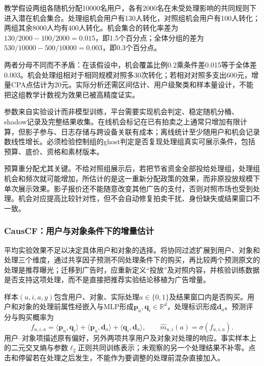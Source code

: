\begin{example}[全体留出与机会对应的分母]
教学假设两组各随机分配10000名用户，各有2000名在未受处理影响的共同规则下进入潜在机会集合。处理组机会用户有130人转化，对照组机会用户有100人转化；两组其余8000人均有400人转化。机会集合的转化率差为$130/2000-100/2000=0.015$，即1.5个百分点；全体分组的差为$530/10000-500/10000=0.003$，即0.3个百分点。

两者分母不同而不矛盾：在该假设中，机会覆盖比例0.2乘条件差0.015等于全体差0.003。机会处理组相对于相同规模对照多30次转化；若相对对照多支出600元，增量CPA点估计为20元。实际分析还需区间估计、用户级聚类和样本量设计，不能把这组教学计数视为效果已被高精度证实。
\end{example}

参数来自实验设计而非模型训练，平台需要实现机会判定、稳定随机分桶、shadow记录及完整结果收集。在线机会标记在已有拍卖之上通常只增加有限计算，但影子参与、日志存储与跨设备关联有成本；离线统计至少随用户和机会记录数线性增长。必须检验控制组的ghost判定是否复现处理组真实可展示条件，包括预算、底价、资格和素材版本。

预算重分配尤其关键。不给对照组展示后，若把节省资金全部投给处理组，处理组机会和频次就可能增加，所估计的是这一重新分配政策的效果，而非原投放规模下单次展示效果。影子报价还不能随意改变其他广告的支付，否则对照市场也受到处理。机会对应提高比较针对性，但不会自动修复拍卖干扰、身份缺失或结果窗口不一致。

\Needspace{90mm}
\subsubsection{CausCF：用户与对象条件下的增量估计}
\label{sec:rs-advertising-causcf}

平均实验效果不足以决定具体用户和对象的选择。将协同过滤扩展到用户、对象和处理三个维度，通过共享因子预测不同处理条件下的购买，再比较两个预测原文的处理是推荐曝光；迁移到广告时，应重新定义“投放”及对照内容，并核验训练数据是否支持这项处理，而不是直接把推荐实验结论移植为广告增量。

样本$(u,i,a,y)$包含用户、对象、实际处理$a\in\{0,1\}$及结果窗口内是否购买。用户和对象的处理前属性经嵌入与MLP形成$\bm{p}_u,\bm{q}_i\in\mathbb R^d$，处理标识形成$\bm{d}_a$。预测评分与购买概率为
\begin{equation}
  f_{u,i,a}
    =\langle\bm{p}_u,\bm{q}_i\rangle
      +\langle\bm{p}_u,\bm{d}_a\rangle
      +\langle\bm{q}_i,\bm{d}_a\rangle,\qquad
  \widehat m_{u,i}(a)=\sigma(f_{u,i,a}).
  \label{eq:rs-advertising-causcf}
\end{equation}
用户--对象项描述原有偏好，另外两项共享用户及对象对处理的响应。事实样本上的二元交叉熵与参数$\ell_2$正则共同训练表示；未观察的另一个处理结果不补零。点击和停留若在处理之后发生，不能作为要调整的处理前混杂直接加入。

